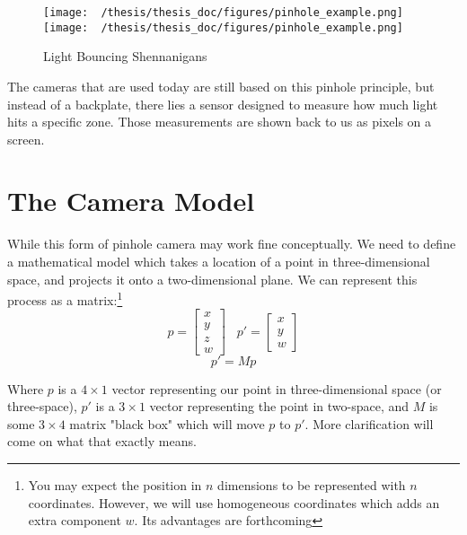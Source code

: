 \documentclass[
    12pt,
    twoside,
    bibstyle=chicago,
    headerstyle=uppercase,
	bibfile=thesis.bib
]{reedthesis}
\begin{document}
\begin{figure}[t]
	    \centering
	    \texttt{[image: ~/thesis/thesis\_doc/figures/pinhole\_example.png]}
		\hfill
		\texttt{[image: ~/thesis/thesis\_doc/figures/pinhole\_example.png]}
	    \caption{Light Bouncing Shennanigans}
	\label{Light Bounce Shennanigans}
	\end{figure}


The cameras that are used today are still based on this pinhole principle, but instead of a backplate, there lies a sensor designed to measure how much light hits a specific zone. Those measurements are shown back to us as pixels on a screen.


\section{The Camera Model}

While this form of pinhole camera may work fine conceptually. We need to define a mathematical model which takes a location of a point in three-dimensional space, and projects it onto a two-dimensional plane. We can represent this process as a matrix:\footnote{You may expect the position in $n$ dimensions to be represented with $n$ coordinates. However, we will use homogeneous coordinates which adds an extra component $w$. Its advantages are forthcoming}
\[p = \left[\begin{smallmatrix}
	x\\y\\z\\w
\end{smallmatrix}\right] \;\;\; p' = \left[\begin{smallmatrix}
	x\\y\\w
\end{smallmatrix}\right]\]
\[p' = Mp\]

Where $p$ is a $4\times1$ vector representing our point in three-dimensional space (or three-space), $p'$ is a $3\times1$ vector representing the point in two-space, and $M$ is some $3\times4$ matrix "black box" which will move $p$ to $p'$. More clarification will come on what that exactly means.
\end{document}
